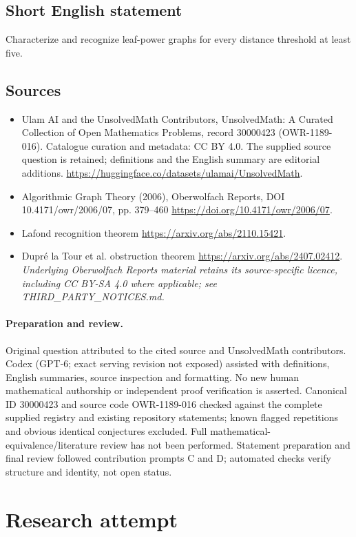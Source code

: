 \documentclass[11pt]{article}
\begin{document}
\subsection{Short English statement}
Characterize and recognize leaf-power graphs for every distance threshold at least five.
\subsection{Sources}
\begin{itemize}
\item[S1] Ulam AI and the UnsolvedMath Contributors, UnsolvedMath: A Curated Collection of Open Mathematics Problems, record 30000423 (OWR-1189-016). Catalogue curation and metadata: CC BY 4.0. The supplied source question is retained; definitions and the English summary are editorial additions.
\url{https://huggingface.co/datasets/ulamai/UnsolvedMath}.
\item[S2] Algorithmic Graph Theory (2006), Oberwolfach Reports, DOI 10.4171/owr/2006/07, pp. 379--460
\url{https://doi.org/10.4171/owr/2006/07}.
\item[S3] Lafond recognition theorem
\url{https://arxiv.org/abs/2110.15421}.
\item[S4] Dupré la Tour et al. obstruction theorem
\url{https://arxiv.org/abs/2407.02412}.
\textit{Underlying Oberwolfach Reports material retains its source-specific licence, including CC BY-SA 4.0 where applicable; see THIRD\_PARTY\_NOTICES.md.}
\end{itemize}
\paragraph{Preparation and review.}
Original question attributed to the cited source and UnsolvedMath contributors. Codex (GPT-6; exact serving revision not exposed) assisted with definitions, English summaries, source inspection and formatting. No new human mathematical authorship or independent proof verification is asserted. Canonical ID 30000423 and source code OWR-1189-016 checked against the complete supplied registry and existing repository statements; known flagged repetitions and obvious identical conjectures excluded. Full mathematical-equivalence/literature review has not been performed. Statement preparation and final review followed contribution prompts C and D; automated checks verify structure and identity, not open status.
\label{end:30000423}

\section{Research attempt}
\end{document}
